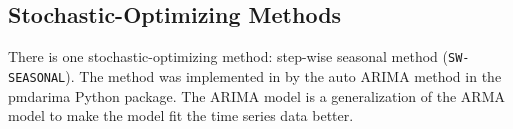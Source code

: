 \subsection{Stochastic-Optimizing Methods}
There is one stochastic-optimizing method: step-wise 
seasonal method (\texttt{SW-SEASONAL}). 
The method was implemented in \deploy by the auto \gls{ARIMA} 
method in the pmdarima \cite{noauthor_pmdarima:_2019}
Python package. 
The \gls{ARIMA} model is a generalization of the \gls{ARMA}
model to make the model fit the time series data better. 

